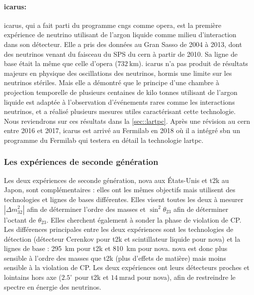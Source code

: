         \paragraph{\gls{icarus}\cite{Antonello2015}:} \gls{icarus}, qui a fait parti du programme \gls{cngs} comme \gls{opera}, est la première expérience de neutrino utilisant de l'argon liquide comme milieu d'interaction dans son détecteur. Elle a pris des données au Gran Sasso de 2004 à 2013, dont des neutrinos venant du faisceau  du SPS du \gls{cern} à partir de 2010. Sa ligne de base était la même que celle d'\gls{opera} ($\SI{732}{\kilo\meter}$). \gls{icarus} n'a pas produit de résultats majeurs en physique des oscillations des neutrinos, hormis une limite sur les neutrinos stériles\cite{Antonello2013}. Mais elle a démontré que le principe d'une chambre à projection temporelle de plusieurs centaines de kilo tonnes utilisant de l'argon liquide est adaptée à l'observation d'événements rares comme les interactions neutrinos, et a réalisé plusieurs mesures utiles caractérisant cette technologie. Nous reviendrons sur ces résultats dans la \autoref{sec::lartpc}. Après une révision au \gls{cern} entre 2016 et 2017, \gls{icarus} est arrivé au Fermilab en 2018 où il a intégré \gls{sbn} un programme du Fermilab qui testera en détail la technologie \gls{lartpc}.

      \subsubsection{Les expériences de seconde génération}

        Les deux expériences de seconde génération, \gls{nova} aux États-Unis et \gls{t2k} au Japon, sont complémentaires : elles ont les mêmes objectifs mais utilisent des technologies et lignes de bases différentes.  Elles visent toutes les deux à mesurer $|\Delta m_{32}^2|$ afin de déterminer l'ordre des masses et $\sin^2{\theta_{23}}$ afin de déterminer l'octant de $\theta_{23}$. Elles cherchent également à sonder la phase de violation de CP. Les différences principales entre les deux expériences sont les technologies de détection (détecteur Cerenkov pour \gls{t2k} et scintillateur liquide pour \gls{nova}) et la lignes de base : \SI{295}{\kilo\meter} pour \gls{t2k} et \SI{810}{\kilo\meter} pour \gls{nova}. \gls{nova} est donc plus sensible à l'ordre des masses que \gls{t2k} (plus d'effets de matière) mais moins sensible à la violation de CP. Les deux expériences ont leurs détecteurs proches et lointains hors axe ($2.5^{\circ}$ pour \gls{t2k} et $\SI{14}{\milli\radian}$ pour \gls{nova}), afin de restreindre le spectre en énergie des neutrinos.
        
